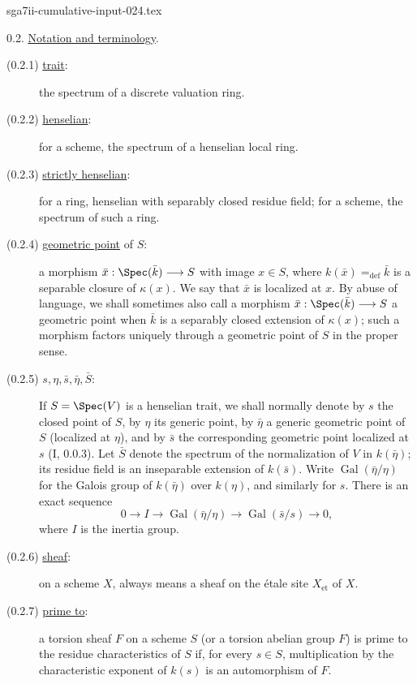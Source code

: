 \begin{filecontents*}{sga7ii-cumulative-input-024.tex}

0.2. \underline{Notation and terminology}.

\begin{description}
\item[(0.2.1) \underline{trait}:]
the spectrum of a discrete valuation ring.

\item[(0.2.2) \underline{henselian}:]
for a scheme, the spectrum of a henselian local ring.

\item[(0.2.3) \underline{strictly henselian}:]
for a ring, henselian with separably closed residue field; for a scheme,
the spectrum of such a ring.

\item[(0.2.4) \underline{geometric point} of $S$:]
a morphism $\bar x:\Spec(\bar k)\longrightarrow S$ with image $x\in S$,
where $k(\bar x)=_{\mathrm{def}}\bar k$ is a separable closure of
$\kappa(x)$.  We say that $\bar x$ is localized at $x$.  By abuse of
language, we shall sometimes also call a morphism
$\bar x:\Spec(\bar k)\longrightarrow S$ a geometric point when $\bar k$
is a separably closed extension of $\kappa(x)$; such a morphism factors
uniquely through a geometric point of $S$ in the proper sense.

\item[(0.2.5) $s,\eta,\bar s,\bar\eta,\bar S$:]
If $S=\Spec(V)$ is a henselian trait, we shall normally denote by $s$
the closed point of $S$, by $\eta$ its generic point, by $\bar\eta$ a
generic geometric point of $S$ (localized at $\eta$), and by $\bar s$
the corresponding geometric point localized at $s$ (I, 0.0.3).  Let
$\bar S$ denote the spectrum of the normalization of $V$ in
$k(\bar\eta)$; its residue field is an inseparable extension of
$k(\bar s)$.  Write $\operatorname{Gal}(\bar\eta/\eta)$ for the Galois
group of $k(\bar\eta)$ over $k(\eta)$, and similarly for $s$.  There is
an exact sequence
\begin{equation*}
0\longrightarrow I\longrightarrow
\operatorname{Gal}(\bar\eta/\eta)\longrightarrow
\operatorname{Gal}(\bar s/s)\longrightarrow0,
\end{equation*}
where $I$ is the inertia group.

\item[(0.2.6) \underline{sheaf}:]
on a scheme $X$, always means a sheaf on the \'{e}tale site
$X_{\mathrm{et}}$ of $X$.

\item[(0.2.7) \underline{prime to}:]
a torsion sheaf $F$ on a scheme $S$ (or a torsion abelian group $F$) is
prime to the residue characteristics of $S$ if, for every $s\in S$,
multiplication by the characteristic exponent of $k(s)$ is an
automorphism of $F$.
\end{description}
\end{filecontents*}

